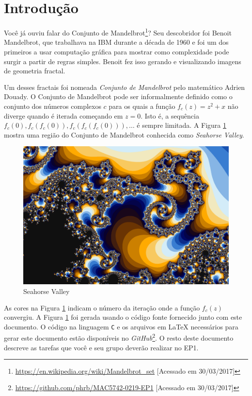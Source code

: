 \documentclass[final,12pt,a4paper]{elsarticle}
\begin{document}

\section{Introdução}

Você já ouviu falar do Conjunto de
Mandelbrot\footnote{\url{https://en.wikipedia.org/wiki/Mandelbrot_set}
[Acessado em 30/03/2017]}?  Seu descobridor foi Benoit Mandelbrot, que
trabalhava na IBM durante a década de 1960 e foi um dos primeiros a usar
computação gráfica para mostrar como complexidade pode surgir a partir de
regras simples. Benoit fez isso gerando e visualizando imagens de geometria
fractal.

Um desses fractais foi nomeada \textit{Conjunto de Mandelbrot} pelo matemático
Adrien Douady.  O Conjunto de Mandelbrot pode ser informalmente definido como o
conjunto dos números complexos $c$ para os quais a função $f_c(z) = z^2 + x$
não diverge quando é iterada começando em $z = 0$. Isto é, a sequência $f_c(0),
f_c(f_c(0)), f_c(f_c(f_c(0))),\dots$ é sempre limitada. A Figura
\ref{fig:header} mostra uma região do Conjunto de Mandelbrot conhecida
como \textit{Seahorse Valley}.

\begin{figure}[htpb]
    \centering
    \includegraphics[width=.82\textwidth]{seahorse}
    \caption{Seahorse Valley}
    \label{fig:header}
\end{figure}

As cores na Figura \ref{fig:header} indicam o número da iteração onde a
função $f_c(z)$ convergiu. A Figura \ref{fig:header} foi gerada usando o
código fonte fornecido junto com este documento. O código na linguagem
\texttt{C} e os arquivos em \LaTeX{} necessários para gerar este documento
estão disponíveis no
\textit{GitHub}\footnote{\url{https://github.com/phrb/MAC5742-0219-EP1}
[Acessado em 30/03/2017]}. O resto deste documento descreve as tarefas que você
e seu grupo deverão realizar no EP1.
\end{document}
